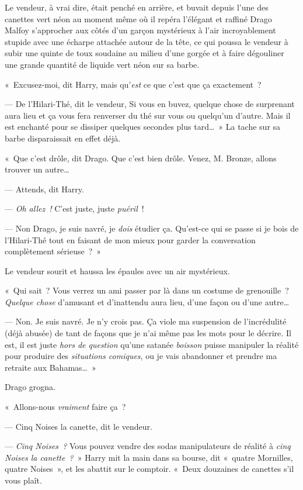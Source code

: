Le vendeur, à vrai dire, était penché en arrière, et buvait depuis l'une des canettes vert néon au moment même où il repéra l'élégant et raffiné Drago Malfoy s'approcher aux côtés d'un garçon mystérieux à l'air incroyablement stupide avec une écharpe attachée autour de la tête, ce qui poussa le vendeur à subir une quinte de toux soudaine au milieu d'une gorgée et à faire dégouliner une grande quantité de liquide vert néon sur sa barbe.

«~Excusez-moi, dit Harry, mais qu'\emph{est} ce que c'est que ça exactement~?

--- De l'Hilari-Thé, dit le vendeur, Si vous en buvez, quelque chose de surprenant aura lieu et ça vous fera renverser du thé sur vous ou quelqu'un d'autre. Mais il est enchanté pour se dissiper quelques secondes plus tard…~» La tache sur sa barbe disparaissait en effet déjà.

«~Que c'est drôle, dit Drago. Que c'est bien drôle. Venez, M. Bronze, allons trouver un autre…

--- Attends, dit Harry.

--- \emph{Oh allez~!} C'est juste, juste \emph{puéril}~!

--- Non Drago, je suis navré, je \emph{dois} étudier ça. Qu'est-ce qui se passe si je bois de l'Hilari-Thé tout en faisant de mon mieux pour garder la conversation complètement sérieuse~?~»

Le vendeur sourit et haussa les épaules avec un air mystérieux.

«~Qui sait~? Vous verrez un ami passer par là dans un costume de grenouille~? \emph{Quelque chose} d'amusant et d'inattendu aura lieu, d'une façon ou d'une autre…

--- Non. Je suis navré. Je n'y crois pas. Ça viole ma suspension de l'incrédulité (déjà abusée) de tant de façons que je n'ai même pas les mots pour le décrire. Il est, il est juste \emph{hors de question} qu'une satanée \emph{boisson} puisse manipuler la réalité pour produire des \emph{situations comiques}, ou je vais abandonner et prendre ma retraite aux Bahamas…~»

Drago grogna.

«~Allons-nous \emph{vraiment} faire ça~?

--- Cinq Noises la canette, dit le vendeur.

--- \emph{Cinq Noises~?} Vous pouvez vendre des sodas manipulateurs de réalité à \emph{cinq Noises la canette~?}~» Harry mit la main dans sa bourse, dit «~quatre Mornilles, quatre Noises~», et les abattit sur le comptoir. «~Deux douzaines de canettes s'il vous plaît.

